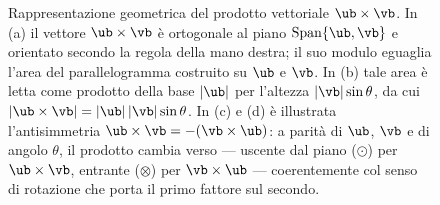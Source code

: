 \begin{figure}[htbp]
	\caption{Rappresentazione geometrica del prodotto vettoriale $\ub\times\vb$.
		In (a) il vettore $\ub\times\vb$ è ortogonale al piano
		$\mathrm{Span}\{\ub,\vb\}$ e orientato secondo la regola della mano
		destra; il suo modulo eguaglia l'area del parallelogramma costruito
		su $\ub$ e $\vb$. In (b) tale area è letta come prodotto della base
		$|\ub|$ per l'altezza $|\vb|\sin\theta$, da cui
		$|\ub\times\vb| = |\ub|\,|\vb|\sin\theta$. In (c) e (d) è illustrata
		l'antisimmetria $\ub\times\vb = -(\vb\times\ub)$: a parità di $\ub$,
		$\vb$ e di angolo $\theta$, il prodotto cambia verso --- uscente dal
		piano ($\odot$) per $\ub\times\vb$, entrante ($\otimes$) per
		$\vb\times\ub$ --- coerentemente col senso di rotazione che porta il
		primo fattore sul secondo.}
	\label{f:prodotto_vettoriale}
\end{figure}
